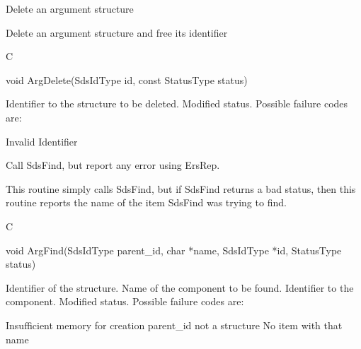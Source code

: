\begin{manroutinedescription}
      Delete an argument structure

      Delete an argument structure and free its identifier
 
      C

      void ArgDelete(SdsIdType id, const StatusType {\mantt{*}} status)
 
\begin{manparametertable}
 Identifier to the structure to %
be deleted.
 Modified status. Possible %
failure codes are:
\end{manparametertable}
\begin{mantwocolumntable}
Invalid Identifier
\end{mantwocolumntable}
\end{manroutinedescription}
\begin{manroutinedescription}
      Call SdsFind, but report any error using ErsRep.

      This routine simply calls SdsFind, but if SdsFind returns a bad
      status, then this routine reports the name of the item
      SdsFind was trying to find.
 
      C

       void ArgFind(SdsIdType parent\_{}id, char *name, SdsIdType *id,
         StatusType {\mantt{*}}  status)

\begin{manparametertable}
 Identifier of the %
structure.
 Name of the component to be found.
 Identifier to the component.
 Modified status. Possible %
failure codes are:
\end{manparametertable}
\begin{mantwocolumntable}
Insufficient memory for creation
parent\_{}id not a structure
No item with that name
\end{mantwocolumntable}
\end{manroutinedescription}
